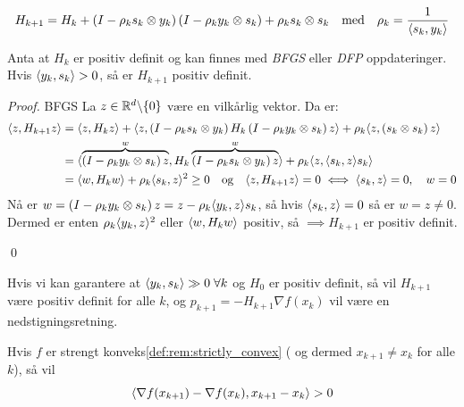 \[
  H_{k+1} = H_k + \left(I - \rho_k s_k \otimes y_k\right) \left(I - \rho_k y_k \otimes s_k\right) + \rho_k s_k \otimes s_k \quad \text{med} \quad \rho_k = \frac{1}{\langle s_k, y_k\rangle}
\]

\begin{lemma}{}{}
  Anta at \( H_k \) er positiv definit og kan finnes med \textit{BFGS} eller \textit{DFP} oppdateringer.
  Hvis \( \langle y_k, s_k\rangle > 0 \), så er \( H_{k+1} \) positiv definit.
\end{lemma}

\begin{proof}{BFGS}{}
  La \( z \in \mathbb{R}^d \backslash \{0\} \) være en vilkårlig vektor.
  Da er:
  \begin{align*}
    \langle z, H_{k+1} z\rangle & = \langle z, H_k z\rangle + \langle z, \left(I - \rho_k s_k \otimes y_k\right)H_k \left(I - \rho_k y_k \otimes s_k\right) z\rangle + \rho_k \langle z, \left(s_k \otimes s_k\right) z\rangle   \\
                         & = \langle\overbrace{\left(I - \rho_k y_k \otimes s_k\right) z}^{w}, H_k \overbrace{\left(I - \rho_k s_k \otimes y_k\right) z}^{w}\rangle + \rho_k \langle z, \langle s_k, z\rangle s_k\rangle \\
                         & = \langle w, H_k w\rangle + \rho_k \langle s_k, z\rangle^2 \geq 0 \quad \text{og} \quad \langle z, H_{k+1} z\rangle = 0 \iff \langle s_k, z\rangle = 0, \quad w = 0
  \end{align*}
  Nå er \( w = \left(I - \rho_k y_k \otimes s_k\right) z = z - \rho_k \langle y_k, z\rangle s_k \), så hvis \( \langle s_k, z\rangle = 0 \) så er \( w = z \neq 0 \).
  Dermed er enten \( \rho_k\langle y_k, z\rangle^2\) eller \( \langle w, H_k w\rangle \) positiv, så \(\implies H_{k+1} \) er positiv definit.
  
  \qed
\end{proof}


Hvis vi kan garantere at \( \langle y_k, s_k\rangle \gg 0 \; \forall k \) og \( H_0 \) er positiv definit, så vil \( H_{k+1} \) være positiv definit for alle \( k \), og \(p_{k+1} = -H_{k+1} \nabla f(x_k) \) vil være en nedstigningsretning.

Hvis \( f \) er strengt konveks\ref{def:rem:strictly_convex} ( og dermed \(x_{k+1} \neq x_k \) for alle \( k \)), så vil 
\[
\langle\nabla f(x_{k+1}) - \nabla f(x_k), x_{k+1} - x_k\rangle > 0
\]

